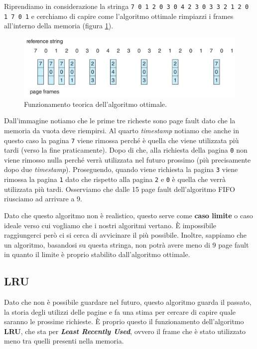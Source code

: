 Riprendiamo in considerazione la stringa \texttt{\small 7 0 1 2 0 3 0 4 2 3 0 3 3 2 1 2 0 1 7 0 1} e cerchiamo di capire come l'algoritmo ottimale rimpiazzi i frames all'interno della memoria (figura \ref{fig:optimal}). 
\begin{figure}[h]
    \centering
    \includegraphics[width = .85\textwidth]{../res/imgs/virtual memory/optimal.png}
    \caption{Funzionamento teorica dell'algoritmo ottimale.}
    \label{fig:optimal}
\end{figure}
Dall'immagine notiamo che le prime tre richeste sono page fault dato che la memoria da vuota deve riempirsi. Al quarto \textit{timestamp} notiamo che anche in questo caso la pagina \texttt{7} viene rimossa perché è quella che viene utilizzata più tardi (verso la fine praticamente). Dopo di che, alla richiesta della pagina \texttt{0} non viene rimosso nulla perché verrà utilizzata nel futuro prossimo (più precisamente dopo due \textit{timestamp}). Proseguendo, quando viene richiesta la pagina \texttt{3} viene rimossa la pagina \texttt{1} dato che rispetto alla pagina \texttt{2} e \texttt{0} è quella che verrà utilizzata più tardi. Osserviamo che dalle 15 page fault dell'algoritmo FIFO riusciamo ad arrivare a 9. 

Dato che questo algoritmo non è realistico, questo serve come \textbf{caso limite} o caso ideale verso cui vogliamo che i nostri algoritmi vertano. È impossibile raggiungerci però ci si cerca di avvicinare il più possibile. Inoltre, sappiamo che un algoritmo, basandosi su questa stringa, non potrà avere meno di 9 page fault in quanto il limite è proprio stabilito dall'algoritmo ottimale.

%
\subsection{LRU}
Dato che non è possibile guardare nel futuro, questo algoritmo guarda il passato, la storia degli utilizzi delle pagine e fa una stima per cercare di capire quale saranno le prossime richieste. È proprio questo il funzionamento dell'algoritmo \textbf{LRU}, che sta per \textbf{\textit{Least Recently Used}}, ovvero il frame che è stato utilizzato meno tra quelli presenti nella memoria.

